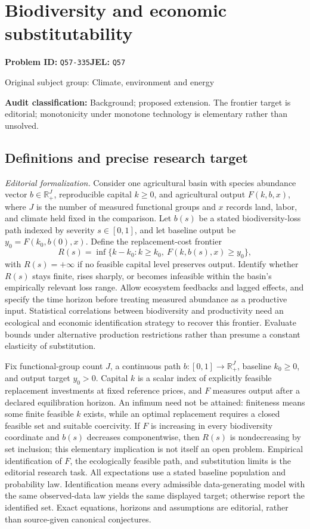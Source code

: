 \documentclass[11pt,a4paper]{article}
\begin{document}
\section*{Biodiversity and economic substitutability}
\textbf{Problem ID:} \texttt{Q57-335}\quad \textbf{JEL:} \texttt{Q57}\par
\label{problem:OP-0436}
{\sffamily\small\color{muted}Original subject group: Climate, environment and energy\par}
\label{definitions:problem:30007718}
\textbf{Audit classification:} Background; proposed extension. The frontier target is editorial; monotonicity under monotone technology is elementary rather than unsolved.
\subsection*{Definitions and precise research target}
\textit{Editorial formalization.} Consider one agricultural basin with species abundance vector \(b\in\mathbb R_+^J\), reproducible capital \(k\geq0\), and agricultural output \(F(k,b,x)\), where \(J\) is the number of measured functional groups and \(x\) records land, labor, and climate held fixed in the comparison. Let \(b(s)\) be a stated biodiversity-loss path indexed by severity \(s\in[0,1]\), and let baseline output be \(y_0=F(k_0,b(0),x)\). Define the replacement-cost frontier
\[R(s)=\inf\{k-k_0:k\geq k_0,\ F(k,b(s),x)\geq y_0\},\]
with \(R(s)=+\infty\) if no feasible capital level preserves output. Identify whether \(R(s)\) stays finite, rises sharply, or becomes infeasible within the basin’s empirically relevant loss range. Allow ecosystem feedbacks and lagged effects, and specify the time horizon before treating measured abundance as a productive input. Statistical correlations between biodiversity and productivity need an ecological and economic identification strategy to recover this frontier. Evaluate bounds under alternative production restrictions rather than presume a constant elasticity of substitution.

Fix functional-group count \(J\), a continuous path \(b:[0,1]\to\mathbb R_+^J\), baseline \(k_0\geq0\), and output target \(y_0>0\). Capital \(k\) is a scalar index of explicitly feasible replacement investments at fixed reference prices, and \(F\) measures output after a declared equilibration horizon. An infimum need not be attained: finiteness means some finite feasible \(k\) exists, while an optimal replacement requires a closed feasible set and suitable coercivity. If \(F\) is increasing in every biodiversity coordinate and \(b(s)\) decreases componentwise, then \(R(s)\) is nondecreasing by set inclusion; this elementary implication is not itself an open problem. Empirical identification of \(F\), the ecologically feasible path, and substitution limits is the editorial research task. All expectations use a stated baseline population and probability law. Identification means every admissible data-generating model with the same observed-data law yields the same displayed target; otherwise report the identified set. Exact equations, horizons and assumptions are editorial, rather than source-given canonical conjectures.
\end{document}
